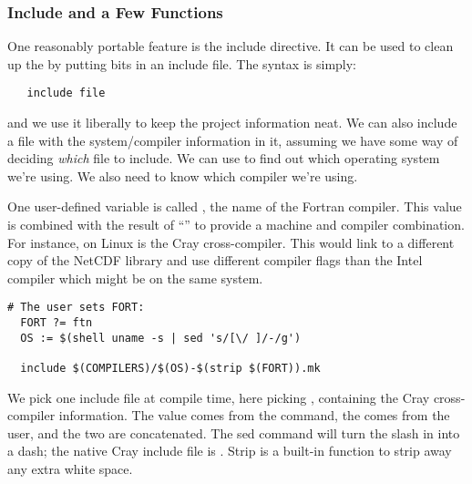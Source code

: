 \subsubsection{Include and a Few Functions}
\label{Inc_fort}

One reasonably portable  feature is the include directive. It
can be used to clean up the  by putting bits in an
include file. The syntax is simply:
\begin{verbatim}
   include file
\end{verbatim}
and we use it liberally to keep the project
information neat. We can also include a file with the system/compiler
information in it, assuming we have some way of deciding {\em which}
file to include. We can use  to find out which operating
system we're using. We also need to know which compiler we're using.

One user-defined variable is called , the name of the
Fortran compiler. This value is combined with the result of
``'' to
provide a machine and compiler combination. For instance,  on
Linux is the Cray cross-compiler. This would link to a different copy
of the NetCDF library and use different compiler flags than the Intel
compiler which might be on the same system.
\begin{verbatim}
# The user sets FORT:
  FORT ?= ftn
  OS := $(shell uname -s | sed 's/[\/ ]/-/g')

  include $(COMPILERS)/$(OS)-$(strip $(FORT)).mk
\end{verbatim}
We pick one include file at compile time, here picking
, containing the Cray cross-compiler information. The
value  comes from the  command, the 
comes from the user, and the two are concatenated.
The sed command will turn the
slash in  into a dash; the native Cray include file is
. Strip is a built-in function to strip away
any extra white space.

